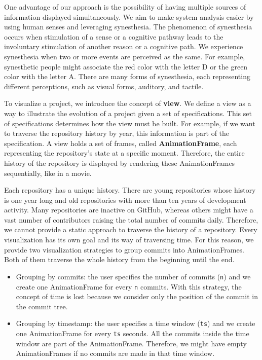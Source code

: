 One advantage of our approach is the possibility of having multiple sources of information displayed simultaneously. We aim to make system analysis easier by using human senses and leveraging synesthesia. The phenomenon of synesthesia occurs when stimulation of a sense or a cognitive pathway leads to the involuntary stimulation of another reason or a cognitive path. We experience synesthesia when two or more events are perceived as the same. 
For example, synesthetic people might associate the red color with the letter D or the green color with the letter A. 
There are many forms of synesthesia, each representing different perceptions, such as visual forms, auditory, and tactile.

To visualize a project, we introduce the concept of \textbf{view}. We define a view as a way to illustrate the evolution of a project given a set of specifications. This set of specifications determines how the view must be built. For example, if we want to traverse the repository history by year, this information is part of the specification. A view holds a set of frames, called \textbf{AnimationFrame}, each representing the repository's state at a specific moment. Therefore, the entire history of the repository is displayed by rendering these AnimationFrames sequentially, like in a movie. 

Each repository has a unique history. There are young repositories whose history is one year long and old repositories with more than ten years of development activity. Many repositories are inactive on GitHub, whereas others might have a vast number of contributors raising the total number of commits daily. Therefore, we cannot provide a static approach to traverse the history of a repository. 
Every visualization has its own goal and its way of traversing time. For this reason, we provide two visualization strategies to group commits into AnimationFrames. Both of them traverse the whole history from the beginning until the end.
\begin{itemize}
    \item{Grouping by commits}: the user specifies the number of commits (\texttt{n}) and we create one AnimationFrame for every \texttt{n} commits. With this strategy, the concept of time is lost because we consider only the position of the commit in the commit tree.
    \item{Grouping by timestamp}: the user specifies a time window (\texttt{ts}) and we create one AnimationFrame for every \texttt{ts} seconds. All the commits inside the time window are part of the AnimationFrame. Therefore, we might have empty AnimationFrames if no commits are made in that time window.
\end{itemize}

